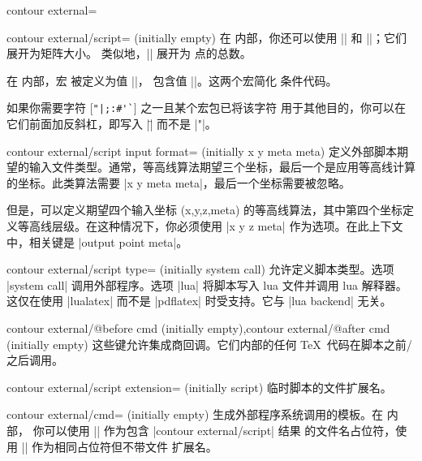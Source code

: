 {{\begin{plottype}[/pgfplots]{
    contour external=\textcolor{black}{}%
}
\begin{pgfplotskey}{contour external/script= (initially empty)}
        在  内部，你还可以使用
        || 和
        ||；它们展开为矩阵大小。
        类似地，|| 展开为
        点的总数。

        在  内部，宏
        \declareandlabel{\thecontournumber} 被定义为值
        ||，
        \declareandlabel{\thecontourlevels} 包含值
        ||。这两个宏简化
        条件代码。

        如果你需要字符 [\verb!"|;:#'`!] 之一且某个宏包已将该字符
        用于其他目的，你可以在它们前面加反斜杠，即写入 |\"| 而不是
        |"|。
    \end{pgfplotskey}

	\begin{pgfplotskey}{contour external/script input format= (initially x y meta meta)}
		定义外部脚本期望的输入文件类型。通常，等高线算法期望三个坐标，最后一个是应用等高线计算的坐标。此类算法需要 |x y meta meta|，最后一个坐标需要被忽略。

		但是，可以定义期望四个输入坐标 (x,y,z,meta) 的等高线算法，其中第四个坐标定义等高线层级。在这种情况下，你必须使用 |x y z meta| 作为选项。在此上下文中，相关键是 |output point meta|。
	\end{pgfplotskey}

	\begin{pgfplotskey}{contour external/script type= (initially system call)}
		允许定义脚本类型。选项 |system call| 调用外部程序。选项 |lua| 将脚本写入 lua 文件并调用 lua 解释器。这仅在使用 |lualatex| 而不是 |pdflatex| 时受支持。它与 |lua backend| 无关。
	\end{pgfplotskey}
	\begin{pgfplotskeylist}{contour external/@before cmd (initially empty),contour external/@after cmd (initially empty)}
		这些键允许集成商回调。它们内部的任何 \TeX\ 代码在脚本之前/之后调用。
	\end{pgfplotskeylist}

    \begin{pgfplotskey}{contour external/script extension= (initially script)}
        临时脚本的文件扩展名。
    \end{pgfplotskey}

    \begin{pgfplotskey}{contour external/cmd= (initially empty)}
        生成外部程序系统调用的模板。在  内部，
        你可以使用 |\script| 作为包含 |contour external/script| 结果
        的文件名占位符，使用 |\scriptbase| 作为相同占位符但不带文件
        扩展名。
    \end{pgfplotskey}


\end{plottype}}}
